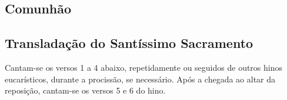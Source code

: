 \AllowPageFlush

\subsection{Comunhão}\label{subsection:hebdomada-sancta/missa-in-cena-domini/communio}

\AllowPageFlush

\subsection{Transladação do Santíssimo Sacramento}\label{subsection:hebdomada-sancta/missa-in-cena-domini/hymnus-ad-translatione-ssmi-sacramenti}
\begin{rubrica}
  Cantam-se os versos 1 a 4 abaixo, repetidamente ou seguidos de outros hinos eucarísticos, durante a procissão, se necessário. Após a chegada ao altar da reposição, cantam-se os versos 5 e 6 do hino.
\end{rubrica}

\AllowPageBreak